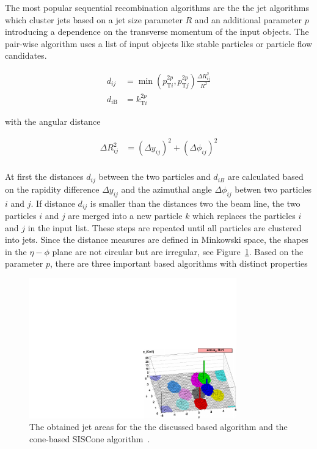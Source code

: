 The most popular sequential recombination algorithms are the the \kt jet
algorithms which cluster jets based on a jet size parameter $R$ and an
additional parameter $p$ introducing a dependence on the transverse momentum of
the input objects. The pair-wise algorithm uses a list of input objects like stable
particles or particle flow candidates. 

\begin{align} 
    d_{ij} &= \min(p_{\mathrm{T}i}^{2p},p_{\mathrm{T}j}^{2p})\frac{\Delta R_{ij}^2}{R^2}\\
    d_{i\mathrm{B}} &= k_{\mathrm{T}i}^{2p}
\end{align} 

with the angular distance

\begin{align}
    \Delta R_{ij}^2 &= (\Delta y_{ij})^2 + (\Delta \phi_{ij})^2\\
\end{align} 

At first the distances $d_{ij}$ between the two particles and $d_{iB}$ are
calculated based on the rapidity difference $\Delta y_{ij}$ and the azimuthal angle
$\Delta \phi_{ij}$ betwen two particles $i$ and $j$. If distance $d_{ij}$ is
smaller than the distances two the beam line, the two particles $i$ and $j$ are
merged into a new particle $k$ which replaces the particles $i$ and $j$ in the
input list. These steps are repeated until all particles are clustered into
jets. Since the distance measures are defined in Minkowski space, the shapes in
the $\eta-\phi$ plane are not circular but are irregular, see
Figure~\ref{fig:jet_shapes}. Based on the parameter $p$, there are three
important \kt based algorithms with distinct properties

\begin{figure}[htb]
    \centering
    \includegraphics[width=0.8\textwidth]{figures/jet_reconstruction/jet_shapes.pdf}
    \caption{The obtained jet areas for the the discussed \kt based algorithm
        and the cone-based SISCone algorithm~\cite{Salam:2009jx}.}
    \label{fig:jet_shapes}
\end{figure}

